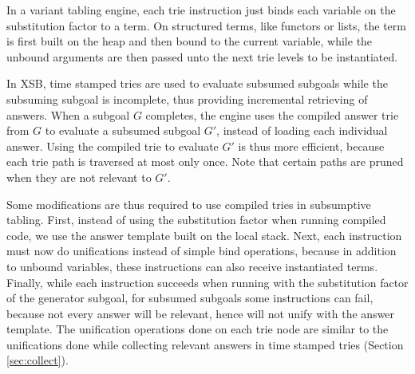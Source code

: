 In a variant tabling engine, each trie instruction just binds each variable on the substitution factor to a term. On structured terms, like functors or lists, the term is first built on the heap and then
bound to the current variable, while the unbound arguments are then passed unto the next trie levels
to be instantiated.

In XSB, time stamped tries are used to evaluate subsumed subgoals while the subsuming subgoal
is incomplete, thus providing incremental retrieving of answers.
When a subgoal $G$ completes, the engine uses the compiled answer trie from $G$
to evaluate a subsumed subgoal $G'$, instead of loading each individual answer.
Using the compiled trie to evaluate $G'$ is thus more efficient, because
each trie path is traversed at most only once. Note that certain paths are pruned when they
are not relevant to $G'$.

Some modifications are thus required to use compiled tries in subsumptive tabling. First,
instead of using the substitution factor when running compiled code, we use the answer template built
on the local stack. Next, each instruction must now do unifications instead of simple bind operations,
because in addition to unbound variables, these instructions can also receive instantiated terms.
Finally, while each instruction succeeds when running with the substitution factor of the generator
subgoal, for subsumed subgoals some instructions can fail, because not every answer will be relevant,
hence will not unify with the answer template. The unification operations done on each trie node
are similar to the unifications done while collecting relevant answers in time stamped tries
(Section \ref{sec:collect}).

